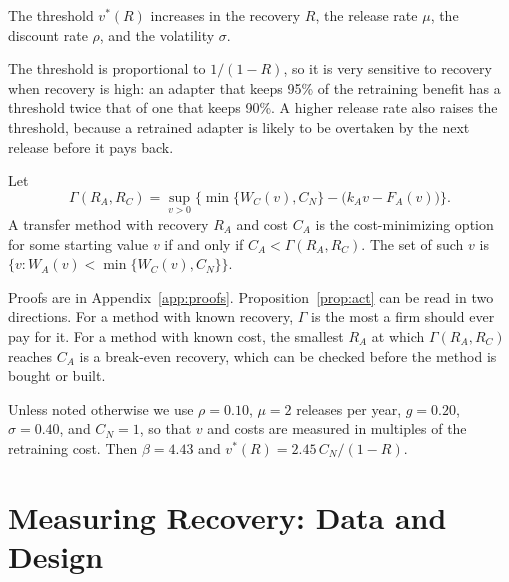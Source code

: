 \documentclass[ijds,nonblindrev]{informs4}
\begin{document}
\begin{proposition}\label{prop:cs}
The threshold $v^*(R)$ increases in the recovery $R$, the release rate $\mu$, the discount rate $\rho$, and the volatility $\sigma$.
\end{proposition}

The threshold is proportional to $1/(1-R)$, so it is very sensitive to recovery when recovery is high: an adapter that keeps 95\% of the retraining benefit has a threshold twice that of one that keeps 90\%. A higher release rate also raises the threshold, because a retrained adapter is likely to be overtaken by the next release before it pays back.

\begin{proposition}\label{prop:act}
Let
\begin{equation}\label{eq:gamma}
\Gamma(R_A,R_C)=\sup_{v>0}\Big\{\min\{W_C(v),C_N\}-\big(k_Av-F_A(v)\big)\Big\}.
\end{equation}
A transfer method with recovery $R_A$ and cost $C_A$ is the cost-minimizing option for some starting value $v$ if and only if $C_A<\Gamma(R_A,R_C)$. The set of such $v$ is $\{v: W_A(v)<\min\{W_C(v),C_N\}\}$.
\end{proposition}

Proofs are in Appendix~\ref{app:proofs}. Proposition~\ref{prop:act} can be read in two directions. For a method with known recovery, $\Gamma$ is the most a firm should ever pay for it. For a method with known cost, the smallest $R_A$ at which $\Gamma(R_A,R_C)$ reaches $C_A$ is a break-even recovery, which can be checked before the method is bought or built.

Unless noted otherwise we use $\rho=0.10$, $\mu=2$ releases per year, $g=0.20$, $\sigma=0.40$, and $C_N=1$, so that $v$ and costs are measured in multiples of the retraining cost. Then $\beta=4.43$ and $v^*(R)=2.45\,C_N/(1-R)$.

\section{Measuring Recovery: Data and Design}\label{sec:design}
\end{document}
